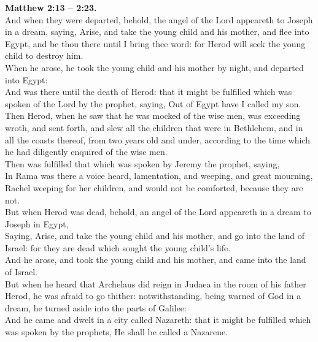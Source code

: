 \documentclass[10pt]{article} %
\begin{document}
{\begin{minipage}[t]{0.45\textwidth}
\textbf{Matthew 2:13 -- 2:23.}\\
And when they were departed, behold, the angel of the Lord appeareth to Joseph in a dream, saying, Arise, and take the young child and his mother, and flee into Egypt, and be thou there until I bring thee word: for Herod will seek the young child to destroy him.\\
When he arose, he took the young child and his mother by night, and departed into Egypt:\\
And was there until the death of Herod: that it might be fulfilled which was spoken of the Lord by the prophet, saying, Out of Egypt have I called my son.\\
Then Herod, when he saw that he was mocked of the wise men, was exceeding wroth, and sent forth, and slew all the children that were in Bethlehem, and in all the coasts thereof, from two years old and under, according to the time which he had diligently enquired of the wise men.\\
Then was fulfilled that which was spoken by Jeremy the prophet, saying,\\
In Rama was there a voice heard, lamentation, and weeping, and great mourning, Rachel weeping for her children, and would not be comforted, because they are not.\\
But when Herod was dead, behold, an angel of the Lord appeareth in a dream to Joseph in Egypt,\\
Saying, Arise, and take the young child and his mother, and go into the land of Israel: for they are dead which sought the young child's life.\\
And he arose, and took the young child and his mother, and came into the land of Israel.\\
But when he heard that Archelaus did reign in Judaea in the room of his father Herod, he was afraid to go thither: notwithstanding, being warned of God in a dream, he turned aside into the parts of Galilee:\\
And he came and dwelt in a city called Nazareth: that it might be fulfilled which was spoken by the prophets, He shall be called a Nazarene.\\
\end{minipage}}
\vspace*{\fill}
\newpage\Huge
\vspace*{\fill}
\singlespacing %
\end{document}
